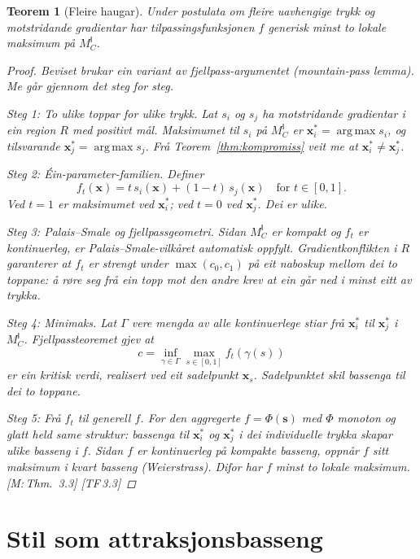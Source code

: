 \documentclass[10pt]{book}
\theoremstyle{definition}
\theoremstyle{plain}
\newtheorem{teorem}[definisjon]{Teorem}
\theoremstyle{remark}
\newcommand{\MC}{M^{\mathsf{I}}_C}
\DeclareMathOperator{\argmax}{arg\,max}
\newcommand{\TF}[1]{\textnormal{[TF\,#1]}}
\newcommand{\Mref}[1]{\textnormal{[M:\,#1]}}
\begin{document}
\begin{teorem}[Fleire haugar]\label{thm:haugar}
Under postulata om fleire uavhengige trykk og motstridande gradientar har tilpassingsfunksjonen $f$ generisk minst to lokale maksimum p\aa{} $\MC$.

\begin{proof}
Beviset brukar ein variant av fjellpass-argumentet (mountain-pass lemma). Me g\aa r gjennom det steg for steg.

\textit{Steg 1: To ulike toppar for ulike trykk.} Lat $s_i$ og $s_j$ ha motstridande gradientar i ein region $R$ med positivt m\aa l. Maksimumet til $s_i$ p\aa{} $\MC$ er $\bm{x}_i^* = \argmax s_i$, og tilsvarande $\bm{x}_j^* = \argmax s_j$. Fr\aa{} Teorem~\ref{thm:kompromiss} veit me at $\bm{x}_i^* \neq \bm{x}_j^*$.

\textit{Steg 2: \' Ein-parameter-familien.} Definer
\[
  f_t(\bm{x}) = t \, s_i(\bm{x}) + (1-t) \, s_j(\bm{x}) \quad \text{for } t \in [0,1].
\]
Ved $t = 1$ er maksimumet ved $\bm{x}_i^*$; ved $t = 0$ ved $\bm{x}_j^*$. Dei er ulike.

\textit{Steg 3: Palais--Smale og fjellpassgeometri.} Sidan $\MC$ er kompakt og $f_t$ er kontinuerleg, er Palais--Smale-vilk\aa ret automatisk oppfylt. Gradientkonflikten i $R$ garanterer at $f_t$ er strengt under $\max(c_0, c_1)$ p\aa{} eit naboskup mellom dei to toppane: \aa{} r\o re seg fr\aa{} ein topp mot den andre krev at ein g\aa r ned i minst eitt av trykka.

\textit{Steg 4: Minimaks.} Lat $\Gamma$ vere mengda av alle kontinuerlege stiar fr\aa{} $\bm{x}_i^*$ til $\bm{x}_j^*$ i $\MC$. Fjellpassteoremet gjev at
\[
  c = \inf_{\gamma \in \Gamma} \max_{s \in [0,1]} f_t(\gamma(s))
\]
er ein kritisk verdi, realisert ved eit sadelpunkt $\bm{x}_s$. Sadelpunktet skil basseng\-a til dei to toppane.

\textit{Steg 5: Fr\aa{} $f_t$ til generell $f$.} For den aggregerte $f = \Phi(\bm{s})$ med $\Phi$ monoton og glatt held same struktur: bassenga til $\bm{x}_i^*$ og $\bm{x}_j^*$ i dei individuelle trykka skapar ulike basseng i $f$. Sidan $f$ er kontinuerleg p\aa{} kompakte basseng, oppn\aa r $f$ sitt maksimum i kvart basseng (Weierstrass). Difor har $f$ minst to lokale maksimum. \Mref{Thm.~3.3} \TF{3.3}
\end{proof}
\end{teorem}

\section{Stil som attraksjonsbasseng}\label{sec:landskap:stil}
\end{document}
